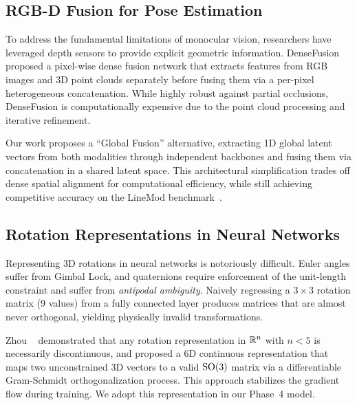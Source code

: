 \subsection{RGB-D Fusion for Pose Estimation}
\label{sec:related_rgbd}

To address the fundamental limitations of monocular vision, researchers have leveraged depth sensors to provide explicit geometric information. DenseFusion~\cite{wang2019densefusion} proposed a pixel-wise dense fusion network that extracts features from RGB images and 3D point clouds separately before fusing them via a per-pixel heterogeneous concatenation. While highly robust against partial occlusions, DenseFusion is computationally expensive due to the point cloud processing and iterative refinement.

Our work proposes a ``Global Fusion'' alternative, extracting 1D global latent vectors from both modalities through independent backbones and fusing them via concatenation in a shared latent space. This architectural simplification trades off dense spatial alignment for computational efficiency, while still achieving competitive accuracy on the LineMod benchmark~\cite{hinterstoisser2012model}.

\subsection{Rotation Representations in Neural Networks}
\label{sec:related_rotation}

Representing 3D rotations in neural networks is notoriously difficult. Euler angles suffer from Gimbal Lock, and quaternions require enforcement of the unit-length constraint and suffer from \emph{antipodal ambiguity}. Naively regressing a $3\times 3$ rotation matrix (9 values) from a fully connected layer produces matrices that are almost never orthogonal, yielding physically invalid transformations. 

Zhou \etal~\cite{zhou2019continuity} demonstrated that any rotation representation in $\mathbb{R}^n$ with $n < 5$ is necessarily discontinuous, and proposed a 6D continuous representation that maps two unconstrained 3D vectors to a valid $\mathrm{SO}(3)$ matrix via a differentiable Gram-Schmidt orthogonalization process. This approach stabilizes the gradient flow during training. We adopt this representation in our Phase~4 model.
